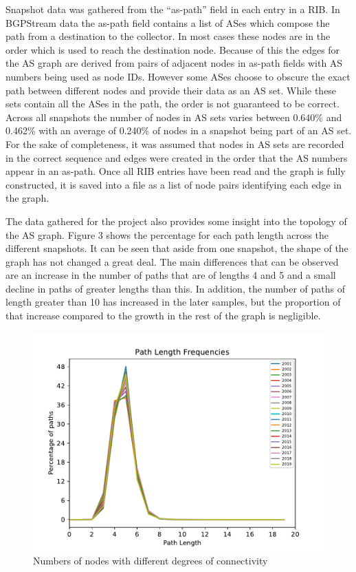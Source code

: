 \documentclass{dissertation/mpaper}
\begin{document}
Snapshot data was gathered from the ``as-path'' field in each entry in a RIB. In BGPStream data the as-path field contains a list of ASes which compose the path from a destination to the collector. In most cases these nodes are in the order which is used to reach the destination node. Because of this the edges for the AS graph are derived from pairs of adjacent nodes in as-path fields with AS numbers being used as node IDs. However some ASes choose to obscure the exact path between different nodes and provide their data as an AS set. While these sets contain all the ASes in the path, the order is not guaranteed to be correct. Across all snapshots the number of nodes in AS sets varies between 0.640\% and 0.462\% with an average of 0.240\% of nodes in a snapshot being part of an AS set. For the sake of completeness, it was assumed that nodes in AS sets are recorded in the correct sequence and edges were created in the order that the AS numbers appear in an as-path. Once all RIB entries have been read and the graph is fully constructed, it is saved into a file as a list of node pairs identifying each edge in the graph.

The data gathered for the project also provides some insight into the topology of the AS graph. Figure 3 shows the percentage for each path length across the different snapshots. It can be seen that aside from one snapshot, the shape of the graph has not changed a great deal. The main differences that can be observed are an increase in the number of paths that are of lengths 4 and 5 and a small decline in paths of greater lengths than this. In addition, the number of paths of length greater than 10 has increased in the later samples, but the proportion of that increase compared to the growth in the rest of the graph is negligible. 

\begin{figure}
    \centering
    \includegraphics{dissertation/images/path-frequencies.pdf}
    \caption{Numbers of nodes with different degrees of connectivity}
    \captionsetup{justification=centering}
\end{figure}
\end{document}
